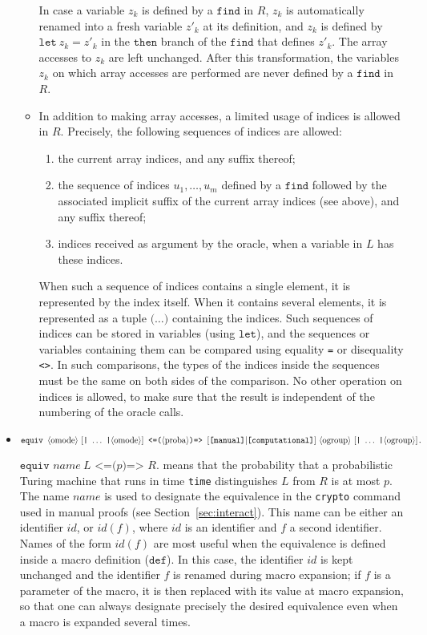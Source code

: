 \begin{itemize}
\begin{itemize}
In case a variable $z_k$ is defined by a $\texttt{find}$ in $R$,
$z_k$ is automatically renamed into a fresh variable $z'_k$ at its definition,
and $z_k$ is defined by $\texttt{let}\ z_k = z'_k$ in the $\texttt{then}$
branch of the $\texttt{find}$ that defines $z'_k$. The array accesses
to $z_k$ are left unchanged. After this transformation, the
variables $z_k$ on which array accesses are performed are never
defined by a $\texttt{find}$ in $R$.

\item In addition to making array accesses, a limited usage of indices is allowed in $R$.
Precisely, the following sequences of indices are allowed:
\begin{enumerate}
\item the current array indices, and any suffix thereof;
\item the sequence of indices $u_1, \ldots, u_m$ defined by a $\texttt{find}$ followed by the associated
implicit suffix of the current array indices (see above), and any suffix thereof;
\item indices received as argument by the oracle, when a variable in $L$ has these indices.
\end{enumerate}
When such a sequence of indices contains a single element, it is represented
by the index itself. When it contains several elements, it is represented
as a tuple $\texttt{(}\dots\texttt{)}$ containing the indices.
Such sequences of indices can be stored in variables (using $\texttt{let}$),
and the sequences or variables containing them can be compared using
equality \texttt{=} or disequality \texttt{<>}. In such comparisons,
the types of the indices inside the sequences must be the same on
both sides of the comparison.
No other operation on indices is allowed, to make sure that the result is
independent of the numbering of the oracle calls.

\end{itemize}
\else
\item $\texttt{equiv }\nonterm{omode}\ [\texttt{|}\ \ldots\ \texttt{|}\nonterm{omode}]\texttt{ <=(}\nonterm{proba}\texttt{)=> }
[\texttt{[manual]}| \texttt{[computational]}]\ \nonterm{ogroup}\ [\texttt{|}\ \ldots\ \texttt{|}\nonterm{ogroup}]\texttt{.}$

$\texttt{equiv }\mathit{name}\ L\texttt{ <=(}p\texttt{)=> }R\texttt{.}$ means that the
probability that a probabilistic Turing machine that runs in time
{\tt time} distinguishes $L$ from $R$ is at most $p$. The name $\mathit{name}$
is used to designate the equivalence in the \texttt{crypto} command used in manual proofs (see Section~\ref{sec:interact}). This name can be either an identifier $\mathit{id}$, or $\mathit{id}(f)$, where $\mathit{id}$ is an identifier and $f$ a second identifier. Names of the form $\mathit{id}(f)$ are most useful when the equivalence is defined inside a macro definition ($\texttt{def}$). In this case, the identifier $\mathit{id}$ is kept unchanged and the identifier $f$ is renamed during macro expansion; if $f$ is a parameter of the macro, it is then replaced with its value at macro expansion, so that one can always designate precisely the desired equivalence even when a macro is expanded several times.


\end{itemize}
